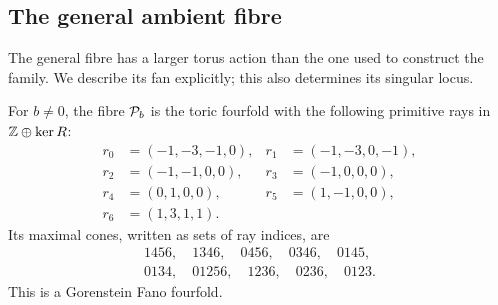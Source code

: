 \subsection{The general ambient fibre}

The general fibre has a larger torus action than the one used to
construct the family.  We describe its fan explicitly; this also
determines its singular locus.

\begin{proposition}\label{prop:toricfibre}
For $b\ne0$, the fibre $\mathcal{P}_b$ is the toric fourfold with the following
primitive rays in $\mathbb{Z}\oplus\ker R$:
\begin{equation}\label{eq:x9rays}
\begin{aligned}
r_0&=(-1,-3,-1,0),&r_1&=(-1,-3,0,-1),\\
r_2&=(-1,-1,0,0),&r_3&=(-1,0,0,0),\\
r_4&=(0,1,0,0),&r_5&=(1,-1,0,0),\\
r_6&=(1,3,1,1).
\end{aligned}
\end{equation}
Its maximal cones, written as sets of ray indices, are
\begin{equation}\label{eq:x9maxcones}
\begin{gathered}
1456,\quad1346,\quad0456,\quad0346,\quad0145,\\
0134,\quad01256,\quad1236,\quad0236,\quad0123.
\end{gathered}
\end{equation}
This is a Gorenstein Fano fourfold.
\end{proposition}

